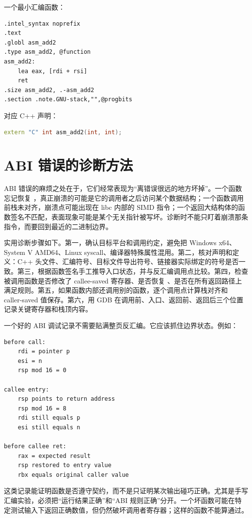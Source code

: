 一个最小汇编函数：

\begin{lstlisting}
.intel_syntax noprefix
.text
.globl asm_add2
.type asm_add2, @function
asm_add2:
    lea eax, [rdi + rsi]
    ret
.size asm_add2, .-asm_add2
.section .note.GNU-stack,"",@progbits
\end{lstlisting}

对应 C++ 声明：

\begin{lstlisting}[language=C++]
extern "C" int asm_add2(int, int);
\end{lstlisting}

\section{ABI 错误的诊断方法}

ABI 错误的麻烦之处在于，它们经常表现为“离错误很远的地方坏掉”。一个函数忘记恢复 ，真正崩溃的可能是它的调用者之后访问某个数据结构；一个函数调用前栈未对齐，崩溃点可能出现在 libc 内部的 SIMD 指令；一个返回大结构体的函数签名不匹配，表面现象可能是某个无关指针被写坏。诊断时不能只盯着崩溃那条指令，而要回到最近的二进制边界。

实用诊断步骤如下。第一，确认目标平台和调用约定，避免把 Windows x64、System V AMD64、Linux syscall、编译器特殊属性混用。第二，核对声明和定义：C++ 头文件、汇编符号、目标文件导出符号、链接器实际绑定的符号是否一致。第三，根据函数签名手工推导入口状态，并与反汇编调用点比较。第四，检查被调用函数是否修改了 callee-saved 寄存器、是否恢复 、是否在所有返回路径上满足规则。第五，如果函数内部还调用别的函数，逐个调用点计算栈对齐和 caller-saved 值保存。第六，用 GDB 在调用前、入口、返回前、返回后三个位置记录关键寄存器和栈顶内容。

一个好的 ABI 调试记录不需要贴满整页反汇编。它应该抓住边界状态。例如：

\begin{lstlisting}
before call:
    rdi = pointer p
    esi = n
    rsp mod 16 = 0

callee entry:
    rsp points to return address
    rsp mod 16 = 8
    rdi still equals p
    esi still equals n

before callee ret:
    rax = expected result
    rsp restored to entry value
    rbx equals original caller value
\end{lstlisting}

这类记录能证明函数是否遵守契约，而不是只证明某次输出碰巧正确。尤其是手写汇编实验，必须把“运行结果正确”和“ABI 规则正确”分开。一个坏函数可能在特定测试输入下返回正确数值，但仍然破坏调用者寄存器；这样的函数不能算通过。

